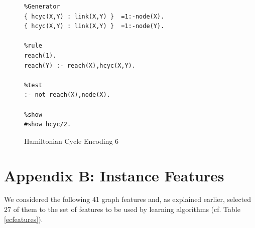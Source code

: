 \documentclass{new_tlp}
\begin{document}
\begin{figure}[!h]
\figrule
\begin{center}
\begin{verbatim}
%Generator
{ hcyc(X,Y) : link(X,Y) }  =1:-node(X).
{ hcyc(X,Y) : link(X,Y) }  =1:-node(Y).

%rule
reach(1).
reach(Y) :- reach(X),hcyc(X,Y).

%test
:- not reach(X),node(X).

%show
#show hcyc/2.
\end{verbatim}
\end{center}
\caption{Hamiltonian Cycle Encoding 6}\label{enc6}
\figrule
\end{figure}

\newpage
\section*{Appendix B: Instance Features}\label{appB}

We considered the following 41 graph features and, as explained earlier, 
selected 27 of them to the set of features to be used by learning 
algorithms (cf. Table \ref{ecfeatures}).
\end{document}

